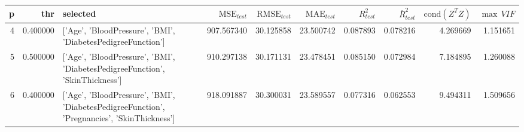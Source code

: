 \begin{tabular}{rrlrrrrrrr}
\toprule
p & thr & selected & $\mathrm{MSE}_{test}$ & $\mathrm{RMSE}_{test}$ & $\mathrm{MAE}_{test}$ & $R^2_{test}$ & $\overline{R}^2_{test}$ & $\mathrm{cond}(Z^T Z)$ & $\max\,VIF$ \\
\midrule
4 & 0.400000 & ['Age', 'BloodPressure', 'BMI', 'DiabetesPedigreeFunction'] & 907.567340 & 30.125858 & 23.500742 & 0.087893 & 0.078216 & 4.269669 & 1.151651 \\
5 & 0.500000 & ['Age', 'BloodPressure', 'BMI', 'DiabetesPedigreeFunction', 'SkinThickness'] & 910.297138 & 30.171131 & 23.478451 & 0.085150 & 0.072984 & 7.184895 & 1.260088 \\
6 & 0.400000 & ['Age', 'BloodPressure', 'BMI', 'DiabetesPedigreeFunction', 'Pregnancies', 'SkinThickness'] & 918.091887 & 30.300031 & 23.589557 & 0.077316 & 0.062553 & 9.494311 & 1.509656 \\
\bottomrule
\end{tabular}
